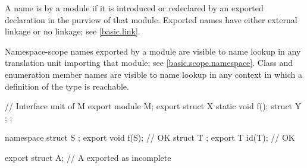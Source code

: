 \begin{std.txt}

  \alinea
  A name is  by a module
  if it is introduced or redeclared
  by an exported declaration in the purview of that module.
  \enternote
  Exported names have either external linkage or no linkage; see \ref{basic.link}.
  \begin{after}\color{addclr}
  Namespace-scope names exported by a module are visible to name lookup
  in any translation unit importing that module; see \ref{basic.scope.namespace}.
  Class and enumeration member names are visible to name lookup in any
  context in which a definition of the type is reachable.
  \end{after}
  \exitnote
  \begin{example}
    \begin{codeblock}
      // Interface unit of M
      export module M;
      export struct X {
        static void f();
        struct Y { };
      };

      namespace {
        struct S { };
      }
      export void f(S);    // OK
      struct T { };
      export T id(T);      // OK
  
      export struct A;     // A exported as incomplete


\end{codeblock}
\end{example}
\end{std.txt}
